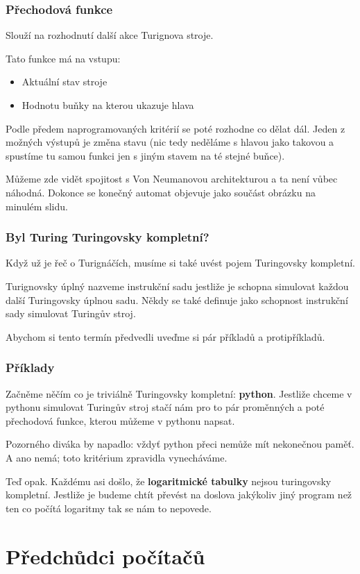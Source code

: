 \documentclass{beamer}
\begin{document}
\begin{frame}
 \frametitle{Přechodová funkce}
 Slouží na rozhodnutí další akce Turignova stroje.

 Tato funkce má na vstupu:
 \begin{itemize}
  \item Aktuální stav stroje
  \item Hodnotu buňky na kterou ukazuje hlava
 \end{itemize}
 Podle předem naprogramovaných kritérií se poté rozhodne co dělat dál. Jeden z
 možných výstupů je změna stavu (nic tedy neděláme s hlavou jako takovou a
 spustíme tu samou funkci jen s jiným stavem na té stejné buňce).

 Můžeme zde vidět spojitost s Von Neumanovou architekturou a ta není vůbec
 náhodná. Dokonce se konečný automat objevuje jako součást obrázku na minulém
 slidu.
\end{frame}
\begin{frame}
\frametitle{Byl Turing Turingovsky kompletní?}
Když už je řeč o Turignáčích, musíme si také uvést pojem Turingovsky kompletní.
\begin{block}{Turignovsky úplný}
nazveme instrukční sadu jestliže je schopna simulovat každou další Turingovsky
úplnou sadu. Někdy se také definuje jako schopnost instrukční sady simulovat
Turingův stroj. 
\end{block}
Abychom si tento termín předvedli uveďme si pár příkladů a protipříkladů.
\end{frame}

\begin{frame}
 \frametitle{Příklady}
 Začněme něčím co je triviálně Turingovsky kompletní: \textbf{python}. Jestliže chceme
 v pythonu simulovat Turingův stroj stačí nám pro to pár proměnných a poté
 přechodová funkce, kterou můžeme v pythonu napsat.

 Pozorného diváka by napadlo: vždyť python přeci nemůže mít nekonečnou paměť. A
 ano nemá; toto kritérium zpravidla vynecháváme.

 \vfill
 Teď opak. Každému asi došlo, že \textbf{logaritmické tabulky} nejsou turingovsky
 kompletní. Jestliže je budeme chtít převést na doslova jakýkoliv jiný program
 než ten co počítá logaritmy tak se nám to nepovede.
 
\end{frame}
\section{Předchůdci počítačů}
\label{sec:fde-cycle}
\end{document}
